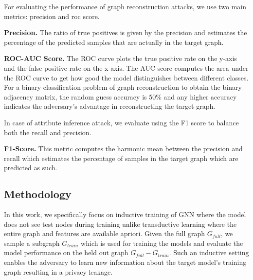 \noindent For evaluating the performance of graph reconstruction attacks, we use two main metrics: precision and roc score.

\noindent\textbf{Precision.} The ratio of true positives is given by the precision and estimates the percentage of the predicted samples that are actually in the target graph.

\noindent\textbf{ROC-AUC Score.} The ROC curve plots the true positive rate on the y-axis and the false positive rate on the x-axis. The AUC score computes the area under the ROC curve to get how good the model distinguishes between different classes.
For a binary classification problem of graph reconstruction to obtain the binary adjacency matrix, the random guess accuracy is 50\% and any higher accuracy indicates the adversary's advantage in reconstructing the target graph. %


\noindent In case of attribute inference attack, we evaluate using the F1 score to balance both the recall and precision.

\noindent\textbf{F1-Score.} This metric computes the harmonic mean between the precision and recall which estimates the percentage of samples in the target graph which are predicted as such.

\subsection{Methodology}

In this work, we specifically focus on inductive training of GNN where the model does not see test nodes during training unlike transductive learning where the entire graph and features are available apriori.
Given the full graph $G_{full}$, we sample a subgraph $G_{train}$ which is used for training the models and evaluate the model performance on the held out graph $G_{full}-G_{train}$.
Such an inductive setting enables the adversary to learn new information about the target model's training graph resulting in a privacy leakage.
